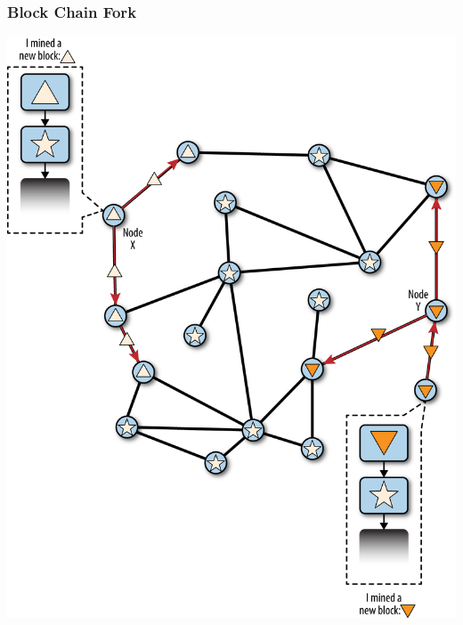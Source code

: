 \begin{frame}
    \frametitle{Block Chain Fork}
    \includegraphics[scale=0.5]{./figures/mbc2_1003.png}
\end{frame}

